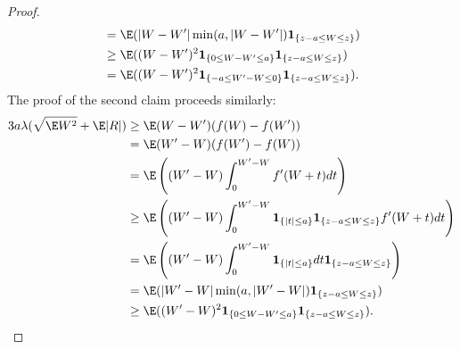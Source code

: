 \begin{proof}
\begin{align*}
    &= \E(|W-W'| \min (a, |W-W'|) \mathbf{1}_{\{z - a \leq W \leq z\}}) \\
    &\geq \E((W-W')^2 \mathbf{1}_{\{0 \leq W - W' \leq a\}} \mathbf{1}_{\{z - a \leq W \leq z\}}) \\
    &= \E((W-W')^2 \mathbf{1}_{\{-a \leq W' - W \leq 0\}} \mathbf{1}_{\{z - a \leq W \leq z\}}).
  \end{align*}
  The proof of the second claim proceeds similarly:
    \begin{align*}
      3a \lambda (\sqrt{\E W^2} + \E |R|) &\geq \E (W-W')(f(W)-f(W')) \\
      &= \E (W'-W)(f(W')-f(W)) \\
      &= \E \left ( (W'-W) \int_{0}^{W'-W} f'(W+t)dt \right ) \\
      &\geq \E \left( (W'-W) \int_{0}^{W'-W} \mathbf{1}_{\{|t| \leq a\}}
      \mathbf{1}_{\{z - a \leq W \leq z\}} f'(W + t) dt \right ) \\
      &= \E \left( (W'-W) \int_{0}^{W'-W} \mathbf{1}_{\{|t| \leq a\}} dt
      \mathbf{1}_{\{z - a \leq W \leq z\}} \right ) \\
      &= \E(|W'-W| \min (a, |W'-W|) \mathbf{1}_{\{z - a \leq W \leq z\}}) \\
      &\geq \E((W'-W)^2 \mathbf{1}_{\{0 \leq W - W' \leq a\}} \mathbf{1}_{\{z - a \leq W \leq z\}}).
  \end{align*}
\end{proof}

